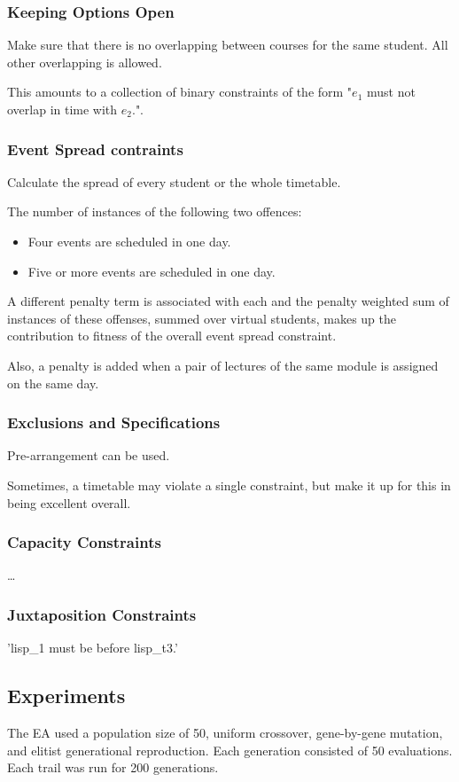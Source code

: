 \documentclass[12pt]{article}
\begin{document}
\subsubsection{Keeping Options Open}
Make sure that there is no overlapping between courses for the same student. All other overlapping is allowed.

This amounts to a collection of binary constraints of the form "$e_1$ must not overlap in time with $e_2$.".

\subsubsection{Event Spread contraints}
Calculate the spread of every student or the whole timetable.

The number of instances of the following two offences:
\begin{itemize}
\item Four events are scheduled in one day.
\item Five or more events are scheduled in one day.
\end{itemize}
A different penalty term is associated with each and the penalty weighted sum of instances of these offenses, summed over virtual students, makes up the contribution to fitness of the overall event spread constraint.

Also, a penalty is added when a pair of lectures of the same module is assigned on the same day.

\subsubsection{Exclusions and Specifications}
Pre-arrangement can be used.

Sometimes, a timetable may violate a single constraint, but make it up for this in being excellent overall.

\subsubsection{Capacity Constraints}
\dots

\subsubsection{Juxtaposition Constraints}
'lisp\_1 must be before lisp\_t3.'

\subsection{Experiments}
The EA used a population size of 50, uniform crossover, gene-by-gene mutation, and elitist generational reproduction. Each generation consisted of 50 evaluations. Each trail was run for 200 generations.
\end{document}
